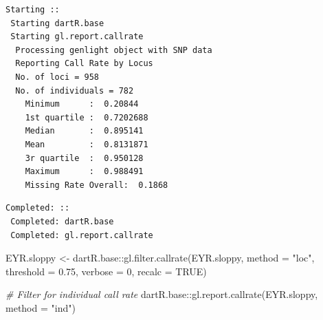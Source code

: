 \documentclass[
  letterpaper,
  DIV=11,
  numbers=noendperiod]{scrreprt}
\newenvironment{Shaded}{\begin{snugshade}}{\end{snugshade}}
\newcommand{\AttributeTok}[1]{\textcolor[rgb]{0.49,0.56,0.16}{#1}}
\newcommand{\CommentTok}[1]{\textcolor[rgb]{0.38,0.63,0.69}{\textit{#1}}}
\newcommand{\ConstantTok}[1]{\textcolor[rgb]{0.53,0.00,0.00}{#1}}
\newcommand{\DecValTok}[1]{\textcolor[rgb]{0.25,0.63,0.44}{#1}}
\newcommand{\FloatTok}[1]{\textcolor[rgb]{0.25,0.63,0.44}{#1}}
\newcommand{\FunctionTok}[1]{\textcolor[rgb]{0.02,0.16,0.49}{#1}}
\newcommand{\NormalTok}[1]{\textcolor[rgb]{0.00,0.44,0.13}{#1}}
\newcommand{\OtherTok}[1]{\textcolor[rgb]{0.00,0.44,0.13}{#1}}
\newcommand{\SpecialCharTok}[1]{\textcolor[rgb]{0.25,0.44,0.63}{#1}}
\newcommand{\StringTok}[1]{\textcolor[rgb]{0.25,0.44,0.63}{#1}}
\let\textttOrig\texttt
\renewcommand{\texttt}[1]{\textttOrig{\color{blue}{#1}}}
\begin{document}
\begin{verbatim}
Starting :: 
 Starting dartR.base 
 Starting gl.report.callrate 
  Processing genlight object with SNP data
  Reporting Call Rate by Locus
  No. of loci = 958 
  No. of individuals = 782 
    Minimum      :  0.20844 
    1st quartile :  0.7202688 
    Median       :  0.895141 
    Mean         :  0.8131871 
    3r quartile  :  0.950128 
    Maximum      :  0.988491 
    Missing Rate Overall:  0.1868 
\end{verbatim}

\begin{figure}[H]

{\centering \texttt{[image: Session10\_SexLinkedMarkers\_files/figure-pdf/unnamed-chunk-13-3.pdf]}

}

\end{figure}

\begin{verbatim}
Completed: :: 
 Completed: dartR.base 
 Completed: gl.report.callrate 
\end{verbatim}

\begin{Shaded}
\begin{Highlighting}[]
\NormalTok{EYR.sloppy }\OtherTok{\textless{}{-}}\NormalTok{ dartR.base}\SpecialCharTok{::}\FunctionTok{gl.filter.callrate}\NormalTok{(EYR.sloppy, }\AttributeTok{method =} \StringTok{"loc"}\NormalTok{,}
    \AttributeTok{threshold =} \FloatTok{0.75}\NormalTok{, }\AttributeTok{verbose =} \DecValTok{0}\NormalTok{, }\AttributeTok{recalc =} \ConstantTok{TRUE}\NormalTok{)}

\CommentTok{\# Filter for individual call rate}
\NormalTok{dartR.base}\SpecialCharTok{::}\FunctionTok{gl.report.callrate}\NormalTok{(EYR.sloppy, }\AttributeTok{method =} \StringTok{"ind"}\NormalTok{)}
\end{Highlighting}
\end{Shaded}
\end{document}
